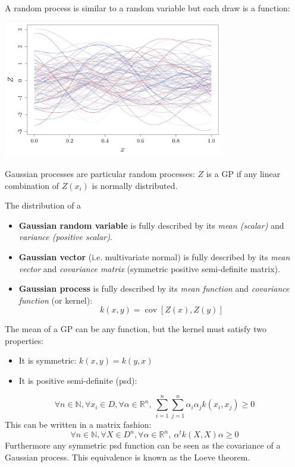 \documentclass{beamer}
\DeclareMathOperator*{\Cov}{cov}
\begin{document}
\begin{frame}{}
A random process is similar to a random variable but each draw is a function:
\begin{center}
\includegraphics[height=6cm]{figures/R/GPR_GaussPrior}
\end{center}
Gaussian processes are particular random processes: $Z$ is a GP if any linear combination of $Z(x_i)$ is normally distributed.
\end{frame}

\begin{frame}{}
The distribution of a
\begin{itemize}
	\item \textbf{Gaussian random variable} is fully described by its \emph{mean (scalar)} and \emph{variance (positive scalar)}.
	\item \textbf{Gaussian vector} (i.e. multivariate normal) is fully described by its \emph{mean vector} and \emph{covariance matrix} (symmetric positive semi-definite matrix).
	\item \textbf{Gaussian process} is fully described by its \emph{mean function} and \emph{covariance function} (or kernel):
	$$ k(x,y) = \Cov[Z(x),Z(y)] $$
\end{itemize}
\end{frame}

\begin{frame}{}
The mean of a GP can be any function, but the kernel must satisfy two properties:
\begin{itemize}
	\item It is symmetric: $k(x,y) = k(y,x)$
	\item It is positive semi-definite (psd):
\end{itemize}
\begin{equation*}
	\forall n \in \mathds{N}, \forall x_i \in D, \forall \alpha \in \mathds{R}^n,\  \sum_{i=1}^n \sum_{j=1}^n \alpha_i \alpha_j k(x_i,x_j) \geq 0
\end{equation*}
This can be written in a matrix fashion:
\begin{equation*}
	\forall n \in \mathds{N}, \forall X \in D^n, \forall \alpha \in \mathds{R}^n,\  \alpha^t k(X,X) \alpha \geq 0
\end{equation*}
Furthermore any symmetric psd function can be seen as the covariance of a Gaussian process. This equivalence is known as the Loeve theorem.
\end{frame}
\end{document}
